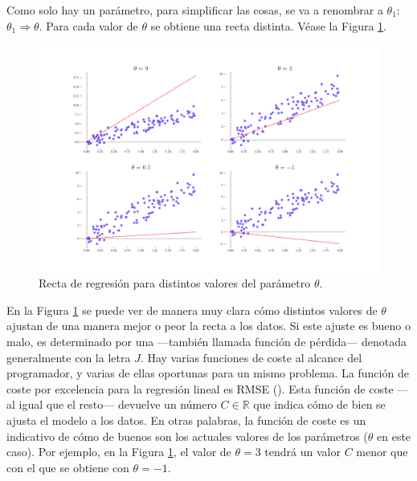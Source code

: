 Como solo hay un parámetro, para simplificar las cosas, se va a renombrar a $\theta_1$: $\theta_1 \Rightarrow \theta$. 
Para cada valor de $\theta$ se obtiene una recta distinta. Véase la Figura \ref{valores_theta}.

\begin{figure}[H]
    \centering
    \includegraphics[scale = 0.35]{imgs/valores_theta.png}
    \caption{Recta de regresión para distintos valores del parámetro $\theta$.}
    \label{valores_theta}
\end{figure}

En la Figura \ref{valores_theta} se puede ver de manera muy clara cómo distintos valores de $\theta$ ajustan de una manera mejor o peor la recta a los datos. Si este ajuste es bueno o malo, es determinado por una  ---también llamada función de pérdida--- denotada generalmente con la letra $J$. Hay varias funciones de coste al alcance del programador, y varias de ellas oportunas para un mismo problema. La función de coste por excelencia para la regresión lineal es RMSE (). Esta función de coste ---al igual que el resto--- devuelve un número $C \in \mathbb{R}$ que indica cómo de bien se ajusta el modelo a los datos. En otras palabras, la función de coste es un indicativo de cómo de buenos son los actuales valores de los  parámetros ($\theta$ en este caso). Por ejemplo, en la Figura \ref{valores_theta}, el valor de $\theta = 3$ tendrá un valor $C$ menor que con el que se obtiene con $\theta = -1$.

